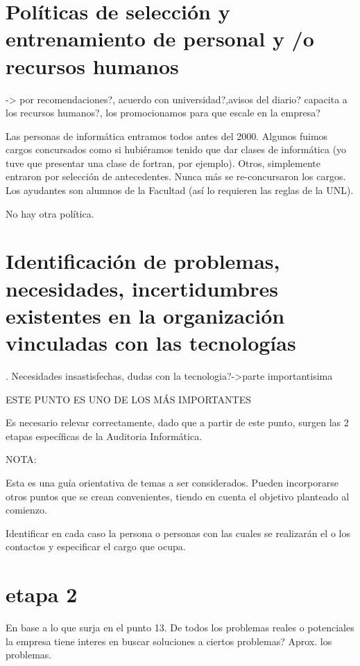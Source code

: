 \documentclass[10pt,a4paper,final]{article}
\begin{document}
\section{Políticas de selección y entrenamiento de personal y /o recursos humanos}
 -> por recomendaciones?, acuerdo con universidad?,avisos del diario? capacita a los recursos humanos?, los promocionamos para que escale en la empresa?

\begin{scriptsize}
   Las personas de informática entramos todos antes del 2000. Algunos fuimos cargos concursados como si hubiéramos tenido que dar clases de informática (yo tuve que presentar una clase de fortran, por ejemplo). Otros, simplemente entraron por selección de antecedentes. Nunca más se re-concursaron los cargos. Los ayudantes son alumnos de la Facultad (así lo requieren las reglas de la UNL).

          No hay otra política. 
\end{scriptsize}

\section{Identificación de problemas, necesidades, incertidumbres existentes en la organización vinculadas con las tecnologías}. Necesidades insastisfechas, dudas con la tecnologia?->parte importantisima


 ESTE PUNTO ES UNO DE LOS MÁS IMPORTANTES

Es necesario relevar correctamente, dado que a partir de este punto, surgen las 2 etapas específicas de la Auditoria Informática.

NOTA:

Esta es una guía orientativa de temas a ser considerados. Pueden incorporarse otros puntos que se crean convenientes, tiendo en cuenta el objetivo planteado al comienzo.

Identificar en cada caso la persona o personas con las cuales se realizarán el o los contactos y especificar el cargo que ocupa.

\section{etapa 2}
En base a lo que surja en el punto 13. De todos los problemas reales o potenciales la empresa tiene interes en buscar soluciones a ciertos problemas?
Aprox. los problemas.
\end{document}

